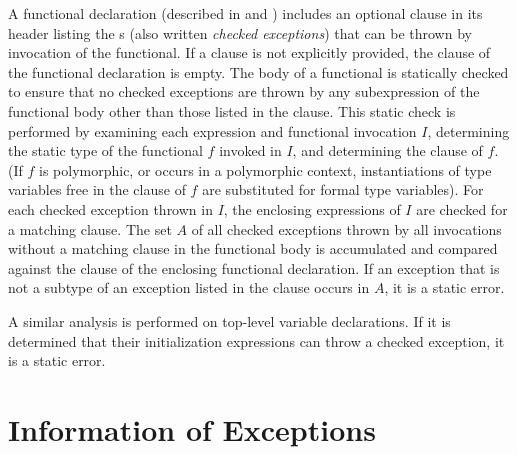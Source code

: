 A functional declaration (described in 
and )
includes an optional  clause in its
header listing the s (also written
\emph{checked exceptions})
that can be thrown by invocation of the functional.  If a 
clause is not explicitly provided, the  clause of the
functional declaration is empty.  The body of a
functional is statically checked to ensure that no checked exceptions
are thrown by any subexpression of the functional
body other than those listed in the  clause.
This static check is performed by examining each  expression and
functional invocation $I$, determining the static
type of the functional $f$ invoked in $I$, and determining the
 clause of
$f$. (If $f$ is polymorphic, or occurs in a polymorphic context,
instantiations of type variables free in the  clause
of $f$  are substituted for formal type variables).
For each checked exception thrown in $I$, the enclosing expressions of
$I$ are checked for a matching  clause.
The set $A$ of all
checked exceptions thrown by all invocations without a matching
 clause in the functional body is accumulated and compared
against the  clause of the enclosing functional declaration. If an
exception that is not a subtype of an exception
listed in the  clause occurs in $A$, it is a static error.

A similar analysis is performed on top-level variable declarations.
If it is determined that their initialization expressions
can throw a checked exception, it is a static error.

\section{Information of Exceptions}

